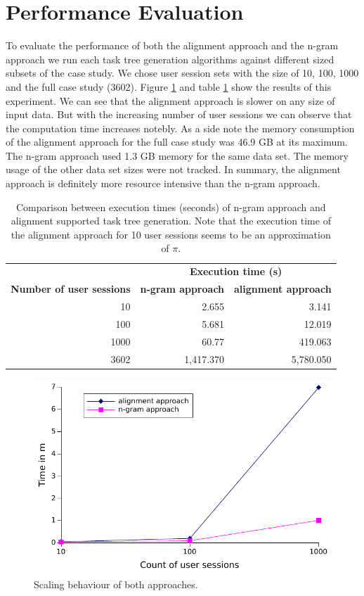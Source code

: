 \section{Performance Evaluation}
To evaluate the performance of both the alignment approach and the n-gram approach we run each task tree generation algorithms against different sized subsets of the case study.
We chose user session sets with the size of 10, 100, 1000 and the full case study (3602). Figure \ref{fig:performance} and table \ref{tab:comparisontasktreegenerations} show the results of this experiment.
We can see that the alignment approach is slower on any size of input data.
But with the increasing number of user sessions we can observe that the computation time increases notebly.
As a side note the memory consumption of the alignment approach for the full case study was 46.9 GB at its maximum.
The n-gram approach used 1.3 GB memory for the same data set.
The memory usage of the other data set sizes were not tracked.
In summary, the alignment approach is definitely more resource intensive than the n-gram approach.
\begin{table}[h]
	\centering
	\begin{tabular}{ r r r }
		\toprule
		& \multicolumn{2}{c}{\textbf{Execution time (s)}} \\
		\cmidrule{2-3}
		\textbf{Number of user sessions} & \textbf{n-gram approach} & \textbf{alignment approach} \\
		\midrule
		10 	& 2.655	& 3.141  \\
		100 	& 5.681	& 12.019\\
		1000 	& 60.77	& 419.063\\
		\midrule
		3602 	& 1,417.370 & 5,780.050\\
		\bottomrule
	\end{tabular}
	\caption{Comparison between execution times (seconds) of n-gram approach and alignment supported task tree generation. Note that the execution time of the alignment approach for 10 user sessions seems to be an approximation of $\pi$. }
	\label{tab:comparisontasktreegenerations}
\end{table}


 \begin{figure}[h]
	\centering
	\includegraphics[]{chapters/casestudy/performance.pdf}
	\caption{Scaling behaviour of both approaches.}
	\label{fig:performance}
\end{figure}

